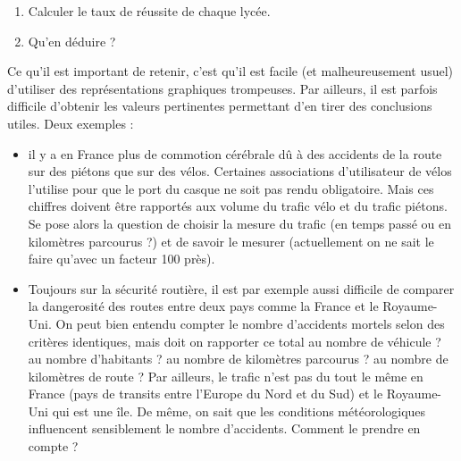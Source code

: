 \documentclass[10pt, a4paper]{article}
\begin{document}
\begin{tcolorbox}[lefttitle=2cm, colframe=gray!75!black, colback=white, title=\textbf{EXERCICE 7 : Paradoxe de Simpson}]
\begin{tcolorbox}[lefttitle=1cm, colframe=gray!75!black, colback=white, title=\textbf{EXERCICE 7.2 : représentation 2}]
\begin{minipage}{0.4\textwidth}
\end{minipage} \hfill
\begin{minipage}{0.6\textwidth}


\begin{enumerate}
    \item Calculer le taux de réussite de chaque lycée. 
    \item Qu’en déduire ?
\end{enumerate}
\end{minipage}


\vspace{3cm}

\end{tcolorbox}

\end{tcolorbox}







Ce qu’il est important de retenir, c’est qu’il est facile (et malheureusement usuel) d’utiliser des représentations
graphiques trompeuses. Par ailleurs, il est parfois difficile d’obtenir les valeurs pertinentes permettant d’en tirer des
conclusions utiles. Deux exemples : 
\begin{itemize}
    \item il y a en France plus de commotion cérébrale dû à des accidents de la route sur
des piétons que sur des vélos. Certaines associations d’utilisateur de vélos l’utilise pour que le port du casque ne soit
pas rendu obligatoire. Mais ces chiffres doivent être rapportés aux volume du trafic vélo et du trafic piétons. Se pose
alors la question de choisir la mesure du trafic (en temps passé ou en kilomètres parcourus ?) et de savoir le mesurer
(actuellement on ne sait le faire qu’avec un facteur 100 près).
\item  Toujours sur la sécurité routière, il est par exemple
aussi difficile de comparer la dangerosité des routes entre deux pays comme la France et le Royaume-Uni. On peut
bien entendu compter le nombre d’accidents mortels selon des critères identiques, mais doit on rapporter ce total
au nombre de véhicule ? au nombre d’habitants ? au nombre de kilomètres parcourus ? au nombre de kilomètres de
route ? Par ailleurs, le trafic n’est pas du tout le même en France (pays de transits entre l’Europe du Nord et du Sud)
et le Royaume-Uni qui est une île. De même, on sait que les conditions météorologiques influencent sensiblement le
nombre d’accidents. Comment le prendre en compte ? 
\end{itemize}
\end{document}
